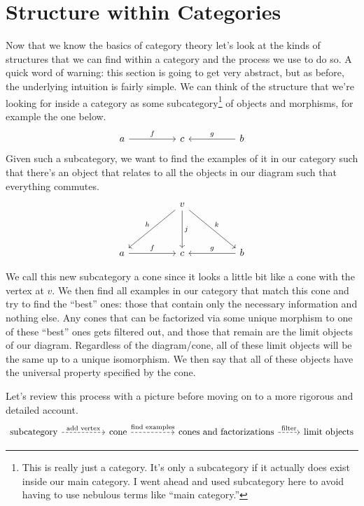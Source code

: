 \documentclass[12pt]{article}
\theoremstyle{definition}
\begin{document}
\section*{Structure within Categories}
\color{blue}
Now that we know the basics of category theory let's look at the kinds of structures that we can find within a category and the process we use to do so.
A quick word of warning: this section is going to get very abstract, but as before, the underlying intuition is fairly simple.
We can think of the structure that we're looking for inside a category as some subcategory\footnote{This is really just a category. It's only a subcategory if it actually does exist inside our main category. I went ahead and used subcategory here to avoid having to use nebulous terms like ``main category.''} of objects and morphisms, for example the one below.
\[\begin{tikzcd}
        a && c && b
        \arrow["f", from=1-1, to=1-3]
        \arrow["g"', from=1-5, to=1-3]
    \end{tikzcd}\]
Given such a subcategory, we want to find the examples of it in our category such that there's an object that relates to all the objects in our diagram such that everything commutes.
\[\begin{tikzcd}
        && v \\
        \\
        a && c && b
        \arrow["f", from=3-1, to=3-3]
        \arrow["g"', from=3-5, to=3-3]
        \arrow["h"', from=1-3, to=3-1]
        \arrow["j", from=1-3, to=3-3]
        \arrow["k", from=1-3, to=3-5]
    \end{tikzcd}\]

We call this new subcategory a cone since it looks a little bit like a cone with the vertex at $v$.
We then find all examples in our category that match this cone and try to find the ``best'' ones: those that contain only the necessary information and nothing else.
Any cones that can be factorized via some unique morphism to one of these ``best'' ones gets filtered out, and those that remain are the limit objects of our diagram.
Regardless of the diagram/cone, all of these limit objects will be the same up to a unique isomorphism.
We then say that all of these objects have the universal property specified by the cone.

Let's review this process with a picture before moving on to a more rigorous and detailed account.
\[\begin{tikzcd}
        {\text{subcategory}} && {\text{cone}} && {\text{cones and factorizations}} & {\text{limit objects}}
        \arrow["{\text{add vertex}}", dashed, from=1-1, to=1-3]
        \arrow["{\text{find examples}}", dashed, from=1-3, to=1-5]
        \arrow["{\text{filter}}", dashed, from=1-5, to=1-6]
    \end{tikzcd}\]
\color{black}
\end{document}
